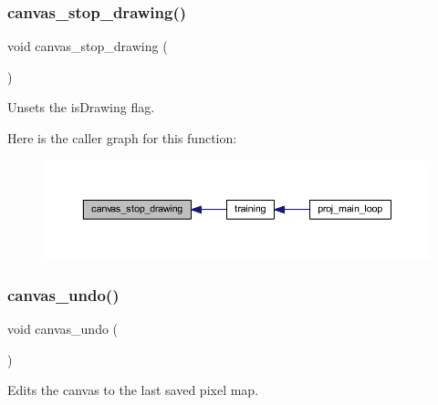 \subsubsection{\texorpdfstring{canvas\+\_\+stop\+\_\+drawing()}{canvas\_stop\_drawing()}}
{\footnotesize\ttfamily void canvas\+\_\+stop\+\_\+drawing (\begin{DoxyParamCaption}{ }\end{DoxyParamCaption})}



Unsets the is\+Drawing flag. 

Here is the caller graph for this function\+:\nopagebreak
\begin{figure}[H]
\begin{center}
\leavevmode
\includegraphics[width=350pt]{group__canvas_ga95994c1c125e70ef4d9380e80ed9c3ab_icgraph}
\end{center}
\end{figure}
\mbox{\label{group__canvas_ga96be607ebdf4fda25a050f017d68db93}} 
\subsubsection{\texorpdfstring{canvas\+\_\+undo()}{canvas\_undo()}}
{\footnotesize\ttfamily void canvas\+\_\+undo (\begin{DoxyParamCaption}{ }\end{DoxyParamCaption})}



Edits the canvas to the last saved pixel map. 

